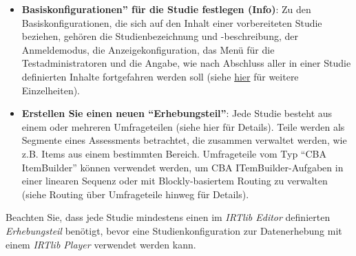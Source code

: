 \documentclass[
  letterpaper,
  DIV=11]{scrreprt}
\begin{document}
\begin{itemize}
\item
  \textbf{Basiskonfigurationen'' für die Studie festlegen (Info)}: Zu
  den Basiskonfigurationen, die sich auf den Inhalt einer vorbereiteten
  Studie beziehen, gehören die Studienbezeichnung und -beschreibung, der
  Anmeldemodus, die Anzeigekonfiguration, das Menü für die
  Testadministratoren und die Angabe, wie nach Abschluss aller in einer
  Studie definierten Inhalte fortgefahren werden soll (siehe
  \protect\hyperlink{konfiguration-von-studien}{hier} für weitere
  Einzelheiten).
\item
  \textbf{Erstellen Sie einen neuen ``Erhebungsteil''}: Jede Studie
  besteht aus einem oder mehreren Umfrageteilen (siehe hier für
  Details). Teile werden als Segmente eines Assessments betrachtet, die
  zusammen verwaltet werden, wie z.B. Items aus einem bestimmten
  Bereich. Umfrageteile vom Typ ``CBA ItemBuilder'' können verwendet
  werden, um CBA ITemBuilder-Aufgaben in einer linearen Sequenz oder mit
  Blockly-basiertem Routing zu verwalten (siehe Routing über
  Umfrageteile hinweg für Details).
\end{itemize}

\begin{tcolorbox}[enhanced jigsaw, colbacktitle=quarto-callout-note-color!10!white, coltitle=black, colframe=quarto-callout-note-color-frame, leftrule=.75mm, breakable, opacitybacktitle=0.6, toprule=.15mm, title=\textcolor{quarto-callout-note-color}{\faInfo}\hspace{0.5em}{Hinweis}, colback=white, titlerule=0mm, arc=.35mm, bottomtitle=1mm, toptitle=1mm, rightrule=.15mm, bottomrule=.15mm, left=2mm, opacityback=0]

Beachten Sie, dass jede Studie mindestens einen im \emph{IRTlib Editor}
definierten \emph{Erhebungsteil} benötigt, bevor eine
Studienkonfiguration zur Datenerhebung mit einem \emph{IRTlib Player}
verwendet werden kann.

\end{tcolorbox}
\end{document}
